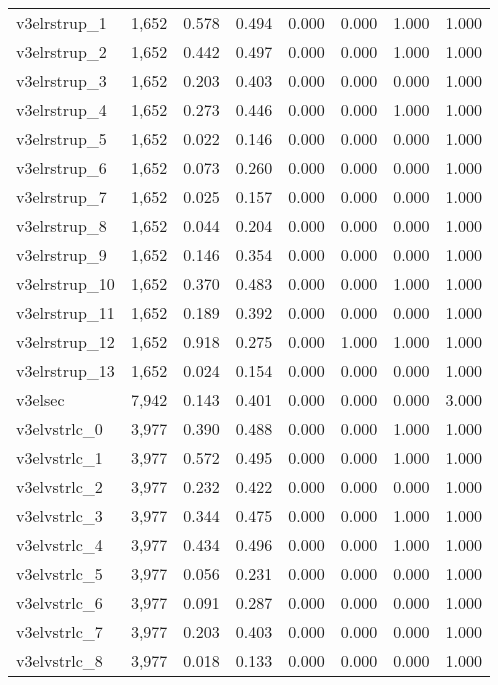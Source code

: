 \begin{table}[!htbp]
\begin{tabular}{@{\extracolsep{5pt}}lccccccc}
v3elrstrup\_1 & 1,652 & 0.578 & 0.494 & 0.000 & 0.000 & 1.000 & 1.000 \\ 
v3elrstrup\_2 & 1,652 & 0.442 & 0.497 & 0.000 & 0.000 & 1.000 & 1.000 \\ 
v3elrstrup\_3 & 1,652 & 0.203 & 0.403 & 0.000 & 0.000 & 0.000 & 1.000 \\ 
v3elrstrup\_4 & 1,652 & 0.273 & 0.446 & 0.000 & 0.000 & 1.000 & 1.000 \\ 
v3elrstrup\_5 & 1,652 & 0.022 & 0.146 & 0.000 & 0.000 & 0.000 & 1.000 \\ 
v3elrstrup\_6 & 1,652 & 0.073 & 0.260 & 0.000 & 0.000 & 0.000 & 1.000 \\ 
v3elrstrup\_7 & 1,652 & 0.025 & 0.157 & 0.000 & 0.000 & 0.000 & 1.000 \\ 
v3elrstrup\_8 & 1,652 & 0.044 & 0.204 & 0.000 & 0.000 & 0.000 & 1.000 \\ 
v3elrstrup\_9 & 1,652 & 0.146 & 0.354 & 0.000 & 0.000 & 0.000 & 1.000 \\ 
v3elrstrup\_10 & 1,652 & 0.370 & 0.483 & 0.000 & 0.000 & 1.000 & 1.000 \\ 
v3elrstrup\_11 & 1,652 & 0.189 & 0.392 & 0.000 & 0.000 & 0.000 & 1.000 \\ 
v3elrstrup\_12 & 1,652 & 0.918 & 0.275 & 0.000 & 1.000 & 1.000 & 1.000 \\ 
v3elrstrup\_13 & 1,652 & 0.024 & 0.154 & 0.000 & 0.000 & 0.000 & 1.000 \\ 
v3elsec & 7,942 & 0.143 & 0.401 & 0.000 & 0.000 & 0.000 & 3.000 \\ 
v3elvstrlc\_0 & 3,977 & 0.390 & 0.488 & 0.000 & 0.000 & 1.000 & 1.000 \\ 
v3elvstrlc\_1 & 3,977 & 0.572 & 0.495 & 0.000 & 0.000 & 1.000 & 1.000 \\ 
v3elvstrlc\_2 & 3,977 & 0.232 & 0.422 & 0.000 & 0.000 & 0.000 & 1.000 \\ 
v3elvstrlc\_3 & 3,977 & 0.344 & 0.475 & 0.000 & 0.000 & 1.000 & 1.000 \\ 
v3elvstrlc\_4 & 3,977 & 0.434 & 0.496 & 0.000 & 0.000 & 1.000 & 1.000 \\ 
v3elvstrlc\_5 & 3,977 & 0.056 & 0.231 & 0.000 & 0.000 & 0.000 & 1.000 \\ 
v3elvstrlc\_6 & 3,977 & 0.091 & 0.287 & 0.000 & 0.000 & 0.000 & 1.000 \\ 
v3elvstrlc\_7 & 3,977 & 0.203 & 0.403 & 0.000 & 0.000 & 0.000 & 1.000 \\ 
v3elvstrlc\_8 & 3,977 & 0.018 & 0.133 & 0.000 & 0.000 & 0.000 & 1.000 \\ 

\end{tabular}
\end{table}
